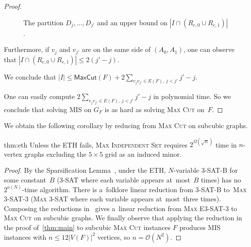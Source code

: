 \documentclass[a4paper,UKenglish,cleveref,autoref]{lipics-v2021}
\newcommand{\mis}{\textsc{Max Independent Set}\xspace}
\newcommand{\smis}{\textsc{MIS}\xspace}
\newcommand{\maxcut}{\mathsf{MaxCut}}
\newcommand{\Oh}{\mathcal{O}}
\begin{document}
\begin{proof}
\begin{claimproof}
\begin{figure}[!ht]
\caption{The partition $D_j, \ldots, D_{j'}$ and an upper bound on $|I\cap(R_{e,0}\cup R_{e,1})|$.}
\label{fig:alpha-upper-bound}
    \end{figure}
    Furthermore, if $v_j$ and $v_{j'}$ are on the same side of $(A_0,A_1)$, one can observe that $|I \cap (R_{e,0} \cup R_{e,1})| \leqslant 2(j'-j)$.

    We conclude that $|I| \leqslant \maxcut(F) + 2 \sum\limits_{v_j v_{j'} \in E(F),~j<j'} j'-j$.
\claimqedhere
  \end{claimproof}

  One can easily compute $2 \sum_{v_j v_{j'} \in E(F),~j<j'} j'-j$ in polynomial time.
  So we conclude that solving \smis on $G_F$ is as hard as solving \textsc{Max Cut} on~$F$.
\qedhere
\end{proof}

We obtain the following corollary by reducing from \textsc{Max Cut} on subcubic graphs.

\begin{repcorollary}{thm:eth}
  Unless the ETH fails, \mis requires $2^{\Omega(\sqrt{n})}$ time in $n$-vertex graphs excluding the $5 \times 5$ grid as an induced minor.
\end{repcorollary}

\begin{proof}
  By the Sparsification Lemma~\cite{sparsification}, under the ETH, $N$-variable \textsc{3-SAT-B} for some constant~$B$ (\textsc{3-SAT} where each variable appears at~most~$B$ times) has no $2^{o(N)}$-time algorithm.
  There is a~folklore linear reduction from \textsc{3-SAT-B} to~\textsc{Max 3-SAT-3} (\textsc{Max 3-SAT} where each variable appears at~most~three times).
  Composing the reductions in~\cite[Theorems 4.1 and 4.2]{Alimonti00} gives a~linear reduction from \textsc{Max E3-SAT-3} to \textsc{Max Cut} on subcubic graphs.
  We finally observe that applying the reduction in the proof of~\cref{thm:main} to subcubic \textsc{Max Cut} instances $F$ produces \smis instances with $n \leqslant 12|V(F)|^2$ vertices, so $n=\Oh(N^2)$.
\end{proof}
\end{document}
